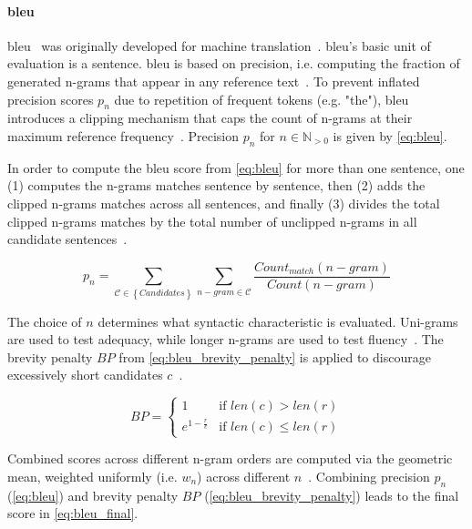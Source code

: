 \paragraph{\ac{bleu}}
\ac{bleu}~\citep{papineni_bleu_2001} was originally developed for machine translation~\citep{zhou_paraphrase_2021}. 
\ac{bleu}'s basic unit of evaluation is a sentence. 
\ac{bleu} is based on precision, i.e. computing the fraction of generated n-grams that appear in any reference text~\citep{kurt_pehlivanoglu_comparative_2024,palivela_optimization_2021,papineni_bleu_2001}. 
To prevent inflated precision scores $p_n$ due to repetition of frequent tokens (e.g. "the"), \ac{bleu} introduces a clipping mechanism that caps the count of n-grams at their maximum reference frequency~\citep{papineni_bleu_2001}. 
Precision $p_n$ for $n \in \mathbb{N}_{>0}$ is given by \autoref{eq:bleu}.

In order to compute the \ac{bleu} score from \autoref{eq:bleu} for more than one sentence, 
one (1) computes the n-grams matches sentence by sentence, 
then (2) adds the clipped n-grams matches across all sentences, 
and finally (3) divides the total clipped n-grams matches by 
the total number of unclipped n-grams in all candidate sentences~\citep{papineni_bleu_2001,cordeiro_bleu_2007}.

\begin{equation}
    p_n = \sum_{\mathcal{C} \in \left\{ Candidates \right\}}\sum_{n-gram \in\mathcal{C}} \frac{Count_{match}(n-gram)}{Count(n-gram)}
\label{eq:bleu}
\end{equation}

The choice of $n$ determines what syntactic characteristic is evaluated.
Uni-grams are used to test adequacy, while longer n-grams are used to test fluency~\citep{papineni_bleu_2001}. 
The brevity penalty $BP$ from \autoref{eq:bleu_brevity_penalty} is applied to discourage excessively short candidates $c$~\citep{papineni_bleu_2001}.


\begin{equation}
    BP = \begin{cases}
        1 & \text{if } len(c) > len(r) \\
        e^{1 - \frac{r}{c}} & \text{if } len(c) \leq len(r)
    \end{cases}
\label{eq:bleu_brevity_penalty}
\end{equation}

Combined scores across different n-gram orders are computed via the geometric mean, weighted uniformly (i.e. $w_n$) across different $n$~\citep{papineni_bleu_2001,banerjee_METEOR_2005}.
Combining precision $p_n$ (\autoref{eq:bleu}) and brevity penalty $BP$ (\autoref{eq:bleu_brevity_penalty}) leads to the final score in \autoref{eq:bleu_final}.

